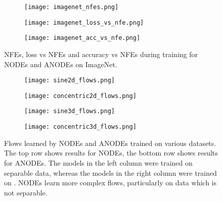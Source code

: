 \documentclass{article}
\begin{document}
\begin{figure}[t]
\centering
\begin{subfigure}[t]{0.32\linewidth}
\centering
\texttt{[image: imagenet\_nfes.png]}
\end{subfigure}
\begin{subfigure}[t]{0.32\linewidth}
\centering
\texttt{[image: imagenet\_loss\_vs\_nfe.png]}
\end{subfigure}
\begin{subfigure}[t]{0.32\linewidth}
\centering
\texttt{[image: imagenet\_acc\_vs\_nfe.png]}
\end{subfigure}
\caption{NFEs, loss vs NFEs and accuracy vs NFEs during training for NODEs and ANODEs on  ImageNet.}
\label{imagenet-training-results}
\end{figure}

\begin{figure}[t]
\centering
\begin{subfigure}[t]{0.35\linewidth}
\centering
\texttt{[image: sine2d\_flows.png]}
\end{subfigure}
\begin{subfigure}[t]{0.35\linewidth}
\centering
\texttt{[image: concentric2d\_flows.png]}
\end{subfigure}
\begin{subfigure}[t]{0.35\linewidth}
\centering
\texttt{[image: sine3d\_flows.png]}
\end{subfigure}
\begin{subfigure}[t]{0.35\linewidth}
\centering
\texttt{[image: concentric3d\_flows.png]}
\end{subfigure}
\caption{Flows learned by NODEs and ANODEs trained on various datasets. The top row shows results for NODEs, the bottom row shows results for ANODEs. The models in the left column were trained on separable data, whereas the models in the right column were trained on . NODEs learn more complex flows, particularly on data which is not separable.}
\label{all-flows-fig}
\end{figure}
\end{document}
